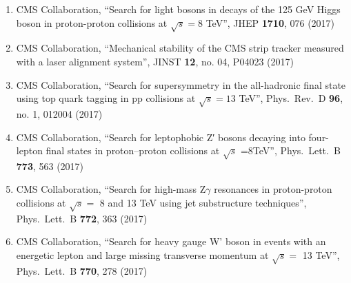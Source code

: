 \begin{enumerate}
\item CMS Collaboration, ``Search for light bosons in decays of the 125 GeV Higgs boson in proton-proton collisions at $ \sqrt{s}=8 $ TeV'', JHEP {\bf 1710}, 076 (2017)

\item CMS Collaboration, ``Mechanical stability of the CMS strip tracker measured with a laser alignment system'', JINST {\bf 12}, no. 04, P04023 (2017)

\item CMS Collaboration, ``Search for supersymmetry in the all-hadronic final state using top quark tagging in pp collisions at $\sqrt s = 13$ TeV'', Phys.\ Rev.\ D {\bf 96}, no. 1, 012004 (2017)

\item CMS Collaboration, ``Search for leptophobic Z′ bosons decaying into four-lepton final states in proton–proton collisions at $\sqrt s$ =8TeV'', Phys.\ Lett.\ B {\bf 773}, 563 (2017)

\item CMS Collaboration, ``Search for high-mass $\mathrm{ Z }\gamma$ resonances in proton-proton collisions at $\sqrt{s}=$ 8 and 13 TeV using jet substructure techniques'', Phys.\ Lett.\ B {\bf 772}, 363 (2017)

\item CMS Collaboration, ``Search for heavy gauge W' boson in events with an energetic lepton and large missing transverse momentum at $ \sqrt{s} = $ 13 TeV'', Phys.\ Lett.\ B {\bf 770}, 278 (2017)


\end{enumerate}
